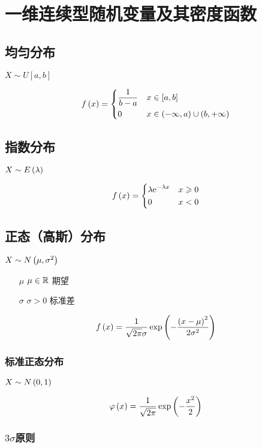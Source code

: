 \documentclass{article}
\begin{document}
\section{一维连续型随机变量及其密度函数}

\subsection{均匀分布}

$X\sim U\left[a,b\right]$

\[f\left(x\right)=\left\{\begin{aligned}
         & \frac1{b-a} &  & x\in\left[a,b\right]               \\
         & 0           &  & x\in\left(-\infty,a\right)\cup\left(b,+\infty\right)
    \end{aligned}\right.\]

\subsection{指数分布}

$X\sim E\left(\lambda\right)$

\[f\left(x\right)=\left\{\begin{aligned}
         & \lambda\mathrm e^{-\lambda x} &  & x\geqslant0 \\
         & 0                      &  & x<0
    \end{aligned}\right.\]

\subsection{正态（高斯）分布}

$X\sim N\left(\mu,\sigma^2\right)$

\begin{enumerate}
    \item [$\mu$] $\mu\in\mathbb R$ 期望
    \item [$\sigma$] $\sigma>0$ 标准差
\end{enumerate}

\[f\left(x\right)=\frac1{\sqrt{2\pi}\sigma}\exp\left(-\frac{{\left(x-\mu\right)}^2}{2\sigma^2}\right)\]

\subsubsection{标准正态分布}

$X\sim N\left(0,1\right)$

\[\varphi\left(x\right)=\frac1{\sqrt{2\pi}}\exp\left(-\frac{x^2}2\right)\]

\subsubsection{$3\sigma$原则}
\end{document}
